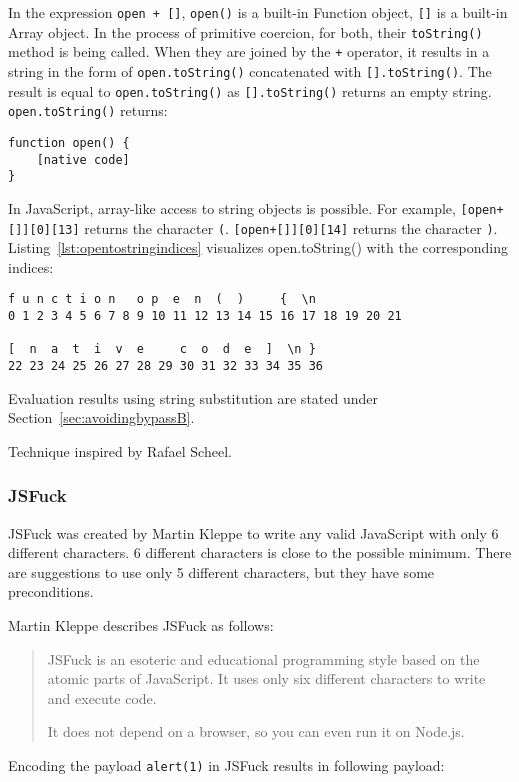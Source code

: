 In the expression \verb|open + []|, \verb|open()| is a built-in Function object, \verb|[]| is a built-in Array object.
In the process of primitive coercion, for both, their \verb|toString()| method is being called.
When they are joined by the \verb|+| operator, it results in a string in the form of \verb|open.toString()| concatenated with \verb|[].toString()|. The result is equal to \verb|open.toString()| as \verb|[].toString()| returns an empty string.
\verb|open.toString()| returns:

\begin{lstlisting}[style=basicStyle]
function open() {
    [native code]
}
\end{lstlisting}

In JavaScript, array-like access to string objects is possible. \cite{js/stringbrackets}
For example, \verb|[open+[]][0][13]| returns the character \verb|(|. \verb|[open+[]][0][14]| returns the character \verb|)|. Listing~\ref{lst:opentostringindices} visualizes open.toString() with the corresponding indices:

\begin{lstlisting}[style=basicStyle, caption=open.toString() with indices in JavaScript, label={lst:opentostringindices}]
f u n c t i o n   o p  e  n  (  )     {  \n
0 1 2 3 4 5 6 7 8 9 10 11 12 13 14 15 16 17 18 19 20 21

[  n  a  t  i  v  e     c  o  d  e  ]  \n }
22 23 24 25 26 27 28 29 30 31 32 33 34 35 36
\end{lstlisting}

Evaluation results using string substitution are stated under Section~\ref{sec:avoidingbypassB}.

Technique inspired by Rafael Scheel. \cite{onecons/wafbypass}


\subsubsection{JSFuck}
\label{sec:jsfuck}
JSFuck was created by Martin Kleppe to write any valid JavaScript with only 6 different characters. 6 different characters is close to the possible minimum. There are suggestions to use only 5 different characters, but they have some preconditions. \cite{mk/five, tc39/pipeline}

Martin Kleppe describes JSFuck as follows:
\begin{quote}
	JSFuck is an esoteric and educational programming style based on the atomic parts of JavaScript. It uses only six different characters to write and execute code.

	It does not depend on a browser, so you can even run it on Node.js. \cite{mk/jsfuck}
\end{quote}
Encoding the payload \verb|alert(1)| in JSFuck results in following payload:

